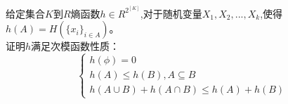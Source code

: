 	\begin{prob} [Homework]
		\mbox{}\par
		\noindent 给定集合$K$到$R$熵函数$h \in {R^{{2^{[K]}}}}$,对于随机变量$X_1, X_2, ..., X_k$,使得$h(A) = H({\{ {x_i}\} _{i \in A}})$。\\
		证明$h$满足次模函数性质：
		$$\left\{ {\begin{array}{*{20}{c}}
			{h(\phi ) = 0} \\
			{h(A) \leqslant h(B),A \subseteq B} \\
			{h(A \cup B) + h(A \cap B) \leqslant h(A) + h(B)}
		  \end{array}} \right.$$
		\sol
	\end{prob}



